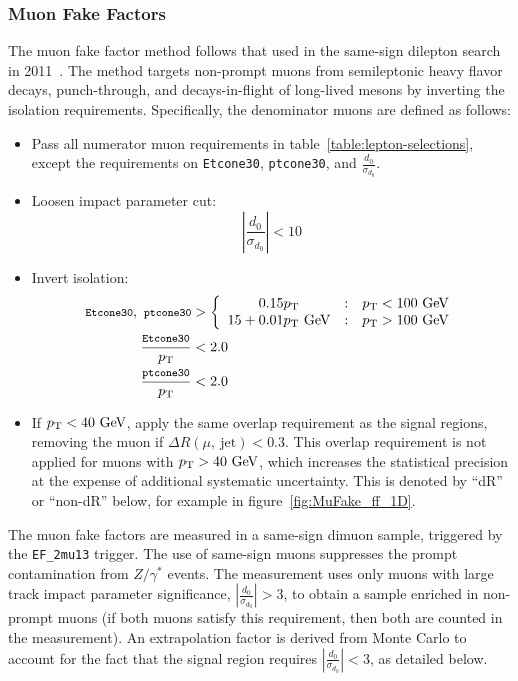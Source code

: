 \subsubsection{Muon Fake Factors}\label{sec:muon-fake-factors}
The muon fake factor method follows that used in the same-sign dilepton search in 2011~\cite{LouiseThesis, 
SSInternal}. The method targets non-prompt muons from semileptonic heavy flavor decays, punch-through, and decays-in-flight of long-lived mesons by inverting the isolation requirements. Specifically, the denominator muons are defined as follows:
\begin{itemize}
  \item Pass all numerator muon requirements in table~\ref{table:lepton-selections}, except the requirements on \verb.Etcone30., \verb.ptcone30., and $\frac{d_0}{\sigma_{d_0}}$. 
  \item Loosen impact parameter cut:
  \begin{equation}
	|\frac{d_0}{\sigma_{d_0}}|<10
  \end{equation}
  \item Invert isolation:
  \begin{align}
	{\footnotesize \texttt{Etcone30}},\ {\footnotesize \texttt{ptcone30}} &> \left\{\begin{array}{ccc} 0.15 p_{\text{T}} & : & p_{\text{T}}<100~\mbox{GeV} \\ 15+0.01 p_{\text{T}}~\mbox{GeV} & : & p_{\text{T}}>100~\mbox{GeV} \end{array} \right. \\
	{\footnotesize \frac{\texttt{Etcone30}}{p_{\text{T}}}} &< 2.0 \\
	{\footnotesize \frac{\texttt{ptcone30}}{p_{\text{T}}}} &< 2.0 \\
  \end{align}
  \item If $p_{\text{T}}<40~\mbox{GeV}$, apply the same overlap requirement as the signal regions, removing the muon if $\Delta R (\mu,\ \mbox{jet})<0.3$. This overlap requirement is not applied for muons with $p_{\text{T}}>40~\mbox{GeV}$, which increases the statistical precision at the expense of additional systematic uncertainty. This is denoted by ``dR'' or ``non-dR'' below, for example in figure~\ref{fig:MuFake_ff_1D}.
\end{itemize}

The muon fake factors are measured in a same-sign dimuon sample, triggered by the \verb.EF_2mu13. trigger. The use of same-sign muons suppresses the prompt contamination from $Z/\gamma^{*}$ events. The measurement uses only muons with large track impact parameter significance, $|\frac{d_0}{\sigma_{d_0}}|>3$, to obtain a sample enriched in non-prompt muons (if both muons satisfy this requirement, then both are counted in the measurement). An extrapolation factor is derived from Monte Carlo to account for the fact that the signal region requires $|\frac{d_0}{\sigma_{d_0}}|<3$, as detailed below.

